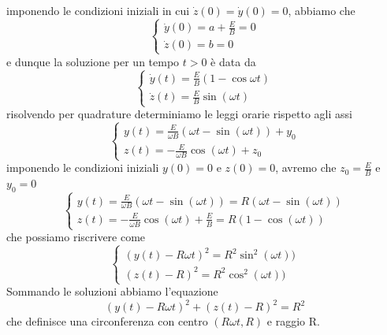 imponendo le condizioni iniziali in cui $\dot{z}(0) = \dot{y}(0) = 0$, abbiamo che
\begin{equation*}
	\left \{ \begin{array}{l}
		\dot{y}(0) = a + \frac{E}{B} = 0 \\[0.3cm]
		\dot{z}(0) = b = 0
	\end{array}\right.
\end{equation*}
e dunque la soluzione per un tempo $t > 0$ \`e data da
\begin{equation*}
	\left \{ \begin{array}{l}
		\dot{y}(t) = \frac{E}{B}(1 - \cos \omega t)\\[0.3cm]
		\dot{z}(t) = \frac{E}{B}\sin (\omega t) 
	\end{array}\right.	
\end{equation*}
risolvendo per quadrature determiniamo le leggi orarie rispetto agli assi
\begin{equation*}
		\left \{ \begin{array}{l}
		y(t) = \frac{E}{\omega B} (\omega t - \sin(\omega t))  + y_0\\[0.3cm]
		z(t) = - \frac{E}{\omega B} \cos (\omega t) + z_0
	\end{array}\right.
\end{equation*}
imponendo le condizioni iniziali $y(0) = 0$ e $z(0) =0$, avremo che $z_0 = \frac{E}{B}$ e $y_0 = 0$
\begin{equation*}
		\left \{ \begin{array}{l}
		 y(t) = \frac{E}{\omega B} (\omega t - \sin(\omega t)) = R(\omega t - \sin(\omega t))  \\[0.3cm]
		z(t) = - \frac{E}{\omega B} \cos (\omega t) + \frac{E}{B} = R(1-\cos(\omega t))
	\end{array}\right.
\end{equation*}
che possiamo riscrivere come 
\begin{equation*}
		\left \{ \begin{array}{l}
		 (y(t) - R\omega t)^2 =  R^2\sin^2(\omega t))  \\[0.3cm]
		(z(t) - R)^2 = R^2\cos^2(\omega t))
	\end{array}\right.
\end{equation*}
Sommando le soluzioni abbiamo l'equazione 
\begin{equation*}
	 (y(t) - R\omega t)^2 + (z(t) - R)^2 = R^2
\end{equation*}
che definisce una circonferenza con centro $(R\omega t ,R)$ e raggio R.

